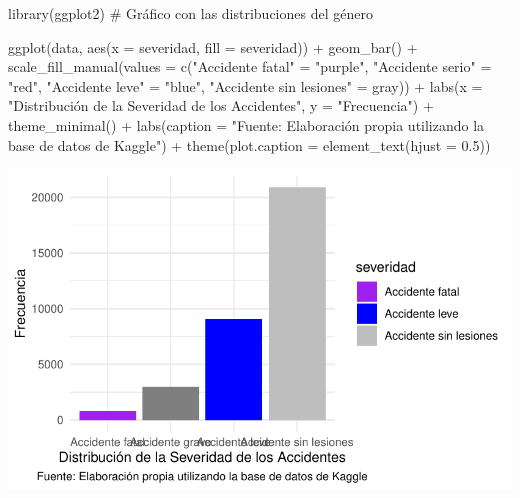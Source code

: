 \documentclass[
  letterpaper,
  DIV=11,
  numbers=noendperiod]{scrartcl}
\newenvironment{Shaded}{\begin{snugshade}}{\end{snugshade}}
\newcommand{\AttributeTok}[1]{\textcolor[rgb]{0.40,0.45,0.13}{#1}}
\newcommand{\CommentTok}[1]{\textcolor[rgb]{0.37,0.37,0.37}{#1}}
\newcommand{\FloatTok}[1]{\textcolor[rgb]{0.68,0.00,0.00}{#1}}
\newcommand{\FunctionTok}[1]{\textcolor[rgb]{0.28,0.35,0.67}{#1}}
\newcommand{\NormalTok}[1]{\textcolor[rgb]{0.00,0.23,0.31}{#1}}
\newcommand{\OtherTok}[1]{\textcolor[rgb]{0.00,0.23,0.31}{#1}}
\newcommand{\SpecialCharTok}[1]{\textcolor[rgb]{0.37,0.37,0.37}{#1}}
\newcommand{\StringTok}[1]{\textcolor[rgb]{0.13,0.47,0.30}{#1}}
\begin{document}
\begin{Shaded}
\begin{Highlighting}[]
\FunctionTok{library}\NormalTok{(ggplot2) }
\CommentTok{\# Gráfico con las distribuciones del género }

\FunctionTok{ggplot}\NormalTok{(data, }\FunctionTok{aes}\NormalTok{(}\AttributeTok{x =}\NormalTok{ severidad, }\AttributeTok{fill =}\NormalTok{ severidad)) }\SpecialCharTok{+} \FunctionTok{geom\_bar}\NormalTok{() }\SpecialCharTok{+} \FunctionTok{scale\_fill\_manual}\NormalTok{(}\AttributeTok{values =} \FunctionTok{c}\NormalTok{(}\StringTok{"Accidente fatal"} \OtherTok{=} \StringTok{"purple"}\NormalTok{, }\StringTok{"Accidente serio"} \OtherTok{=} \StringTok{"red"}\NormalTok{, }\StringTok{"Accidente leve"} \OtherTok{=} \StringTok{"blue"}\NormalTok{, }\StringTok{"Accidente sin lesiones"} \OtherTok{=} \StringTok{\textquotesingle{}gray\textquotesingle{}}\NormalTok{)) }\SpecialCharTok{+} \FunctionTok{labs}\NormalTok{(}\AttributeTok{x =} \StringTok{"Distribución de la Severidad de los Accidentes"}\NormalTok{, }\AttributeTok{y =} \StringTok{"Frecuencia"}\NormalTok{) }\SpecialCharTok{+} \FunctionTok{theme\_minimal}\NormalTok{() }\SpecialCharTok{+} \FunctionTok{labs}\NormalTok{(}\AttributeTok{caption =} \StringTok{"Fuente: Elaboración propia utilizando la base de datos de Kaggle"}\NormalTok{) }\SpecialCharTok{+} \FunctionTok{theme}\NormalTok{(}\AttributeTok{plot.caption =} \FunctionTok{element\_text}\NormalTok{(}\AttributeTok{hjust =} \FloatTok{0.5}\NormalTok{))}
\end{Highlighting}
\end{Shaded}

\includegraphics{cod_bitacora2_files/figure-pdf/unnamed-chunk-7-1.pdf}
\end{document}
